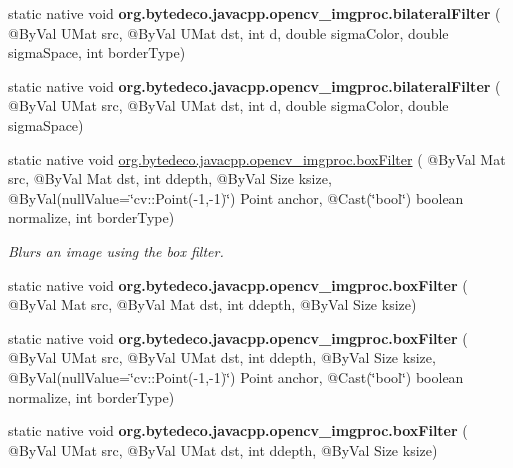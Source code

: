 \begin{DoxyCompactItemize}
\item 
\mbox{\label{group__imgproc__filter_gab8e7ddbf6f483c6b5510fcc2a1d9dccc}} 
static native void {\bfseries org.\+bytedeco.\+javacpp.\+opencv\+\_\+imgproc.\+bilateral\+Filter} ( @By\+Val U\+Mat src, @By\+Val U\+Mat dst, int d, double sigma\+Color, double sigma\+Space, int border\+Type)
\item 
\mbox{\label{group__imgproc__filter_ga4365573ba2b1f21196b689634f7bcfea}} 
static native void {\bfseries org.\+bytedeco.\+javacpp.\+opencv\+\_\+imgproc.\+bilateral\+Filter} ( @By\+Val U\+Mat src, @By\+Val U\+Mat dst, int d, double sigma\+Color, double sigma\+Space)
\item 
static native void \hyperlink{group__imgproc__filter_ga479aa13dd62a69ab5b1a1eac3324ab23}{org.\+bytedeco.\+javacpp.\+opencv\+\_\+imgproc.\+box\+Filter} ( @By\+Val Mat src, @By\+Val Mat dst, int ddepth, @By\+Val Size ksize, @By\+Val(null\+Value=\char`\"{}cv\+::\+Point(-\/1,-\/1)\char`\"{}) Point anchor, @Cast(\char`\"{}bool\char`\"{}) boolean normalize, int border\+Type)
\begin{DoxyCompactList}\small\item\em Blurs an image using the box filter. \end{DoxyCompactList}\item 
\mbox{\label{group__imgproc__filter_gabd35586e95d9c496428ff5883fb88c1a}} 
static native void {\bfseries org.\+bytedeco.\+javacpp.\+opencv\+\_\+imgproc.\+box\+Filter} ( @By\+Val Mat src, @By\+Val Mat dst, int ddepth, @By\+Val Size ksize)
\item 
\mbox{\label{group__imgproc__filter_ga9a5b129f9524b7ce80d094e58a5977a6}} 
static native void {\bfseries org.\+bytedeco.\+javacpp.\+opencv\+\_\+imgproc.\+box\+Filter} ( @By\+Val U\+Mat src, @By\+Val U\+Mat dst, int ddepth, @By\+Val Size ksize, @By\+Val(null\+Value=\char`\"{}cv\+::\+Point(-\/1,-\/1)\char`\"{}) Point anchor, @Cast(\char`\"{}bool\char`\"{}) boolean normalize, int border\+Type)
\item 
\mbox{\label{group__imgproc__filter_ga9130f8858ef9c58528215e2b91a7b1fe}} 
static native void {\bfseries org.\+bytedeco.\+javacpp.\+opencv\+\_\+imgproc.\+box\+Filter} ( @By\+Val U\+Mat src, @By\+Val U\+Mat dst, int ddepth, @By\+Val Size ksize)

\end{DoxyCompactItemize}
